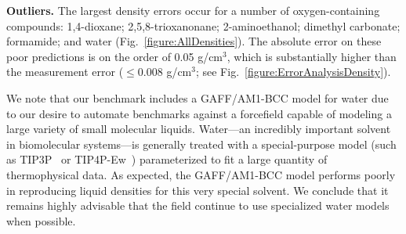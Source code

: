 \documentclass[journal=jacsat,manuscript=article]{achemso}
\begin{document}

{\bf Outliers.}
The largest density errors occur for a number of oxygen-containing compounds: 1,4-dioxane; 2,5,8-trioxanonane; 2-aminoethanol; dimethyl carbonate; formamide; and water (Fig.~\ref{figure:AllDensities}).
The absolute error on these poor predictions is on the order of 0.05  g/cm$^{3}$, which is substantially higher than the measurement error ($\le0.008$ g/cm$^{3}$; see Fig.~\ref{figure:ErrorAnalysisDensity}).  

We note that our benchmark includes a GAFF/AM1-BCC model for water due to our desire to automate benchmarks against a forcefield capable of modeling a large variety of small molecular liquids.
Water---an incredibly important solvent in biomolecular systems---is generally treated with a special-purpose model (such as TIP3P~\cite{jorgensen1983comparison} or TIP4P-Ew~\cite{horn2004}) parameterized to fit a large quantity of thermophysical data.
As expected, the GAFF/AM1-BCC model performs poorly in reproducing liquid densities for this very special solvent.
We conclude that it remains highly advisable that the field continue to use specialized water models when possible.

\end{document}
